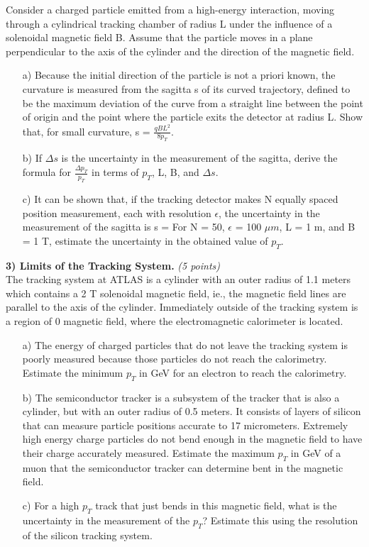 {Consider a charged particle emitted from a high-energy interaction, moving through a cylindrical tracking chamber of radius L under the influence of a solenoidal magnetic field B. 
Assume that the particle moves in a plane perpendicular to the axis of the cylinder and the direction of the magnetic field.
\begin{itemize}
\item[a)]{
Because the initial direction of the particle is not a priori known, the curvature is measured from the sagitta s of its curved trajectory, defined to be the maximum deviation of the curve from a straight line between the point of origin and the point where the particle exits the detector at radius L.
Show that, for small curvature, s = $\frac{qBL^2}{8p_T}$.}
\item[b)]{
If $\Delta s$ is the uncertainty in the measurement of the sagitta, derive the formula for $\frac{\Delta p_T}{p_T}$ in terms of $p_T$, L, B, and $\Delta s$.
}
\item[c)]{
It can be shown that, if the tracking detector makes N equally spaced position measurement, each with resolution $\epsilon$, the uncertainty in the measurement of the sagitta is
\be
\Delta s = 
\ee
For N = 50, $\epsilon$ = 100 $\mu m$, L = 1 m, and B = 1 T, estimate the uncertainty in the obtained value of $p_T$.
}
\end{itemize}

\vspace*{0.25in}

\textbf{3) Limits of the Tracking System.} \hfill \textit{(5 points)}\\

The tracking system at ATLAS is a cylinder with an outer radius of 1.1 meters which contains a 2 T solenoidal magnetic field, ie., the magnetic field lines are parallel to the axis of the cylinder. 
Immediately outside of the tracking system is a region of 0 magnetic field, where the electromagnetic calorimeter is located.

\begin{itemize}
\item[a)]{
The energy of charged particles that do not leave the tracking system is poorly measured because those particles do not reach the calorimetry. 
Estimate the minimum $p_T$ in GeV for an electron to reach the calorimetry.
}

\item[b)]{
The semiconductor tracker is a subsystem of the tracker that is also a cylinder, but with an outer radius of 0.5 meters. 
It consists of layers of silicon that can measure particle positions accurate to 17 micrometers. 
Extremely high energy charge particles do not bend enough in the magnetic field to have their charge accurately measured. 
Estimate the maximum $p_T$ in GeV of a muon that the semiconductor tracker can determine bent in the magnetic field.
}
\item[c)]{
For a high $p_T$ track that just bends in this magnetic field, what is the uncertainty in the measurement of the $p_T$? Estimate this using the resolution of the silicon tracking system.
}
\end{itemize}

}
